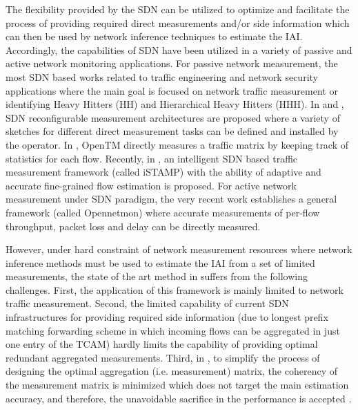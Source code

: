 The flexibility provided by the SDN can be utilized to optimize and facilitate the process of providing required direct measurements and/or side information which can then be used by network inference techniques to estimate the IAI. Accordingly, the capabilities of SDN have been utilized in a variety of passive and active network monitoring applications. For passive network measurement, the most SDN based works related to traffic engineering and network security applications where the main goal is focused on network traffic measurement or identifying Heavy Hitters (HH) and Hierarchical Heavy Hitters (HHH). In \cite{MYu:2011} and \cite{MYu:2013}, SDN reconfigurable measurement architectures are proposed where a variety of sketches for different direct measurement tasks can be defined and installed by the operator. In \cite{Tootoonchian:2010}, OpenTM directly measures a traffic matrix by keeping track of statistics for each flow. Recently, in \cite{IF14iSTAMP:2014}, an intelligent SDN based traffic measurement framework (called iSTAMP) with the ability of adaptive and accurate fine-grained flow estimation is proposed. For active network measurement under SDN paradigm, the very recent work \cite{Adrichen:2014} establishes a general framework (called Opennetmon) where accurate measurements of per-flow throughput, packet loss and delay can be directly measured.

However, under hard constraint of network measurement resources where network inference methods must be used to estimate the IAI from a set of limited measurements, the state of the art method in \cite{IF14iSTAMP:2014} suffers from the following challenges. First, the application of this framework is mainly limited to network traffic measurement. Second, the limited capability of current SDN infrastructures for providing required side information (due to longest prefix matching forwarding scheme in which incoming flows can be aggregated in just one entry of the TCAM) hardly limits the capability of providing optimal redundant aggregated measurements. Third, in \cite{IF14iSTAMP:2014}, to simplify the process of designing the optimal aggregation (i.e. measurement) matrix, the coherency of the measurement matrix is minimized which does not target the main estimation accuracy, and therefore, the unavoidable sacrifice in the performance is accepted \cite{IF14iSTAMP:2014}\cite{Elad:2007}.  

